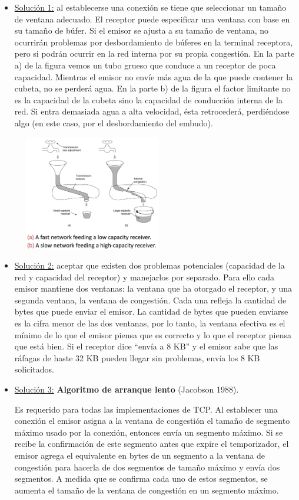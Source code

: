 \documentclass[10pt,a4paper]{report}
\begin{document}
	\begin{itemize}
		\item  \underline{Solución 1:} al establecerse una conexión se tiene que seleccionar un tamaño de ventana adecuado. El receptor puede especificar una ventana con base en su tamaño de búfer. Si el emisor se ajusta a su tamaño de ventana, no ocurrirán problemas por desbordamiento de búferes en la terminal receptora, pero si podrán ocurrir en la red interna por su propia congestión. En la parte a) de la figura vemos un tubo grueso que conduce a un receptor de poca capacidad. Mientras el emisor no envíe más agua de la que puede contener la cubeta, no se perderá agua. En la parte b) de la figura el factor limitante no es la capacidad de la cubeta sino la capacidad de conducción interna de la red. Si entra demasiada agua a alta velocidad, ésta retrocederá, perdiéndose algo (en este caso, por el desbordamiento del embudo).

	\begin{center}
		\includegraphics[width=7cm, height=5cm]{./imagenes/sol1.png} 
	\end{center}

	\item \underline{Solución 2:} aceptar que existen dos problemas potenciales (capacidad de la red y capacidad del receptor) y manejarlos por separado. Para ello cada emisor mantiene dos ventanas:  la ventana que ha otorgado el receptor, y una segunda ventana, la ventana de congestión. Cada una refleja la cantidad de bytes que puede enviar el emisor. La cantidad de bytes que pueden enviarse es la cifra menor de las dos ventanas, por lo tanto, la ventana efectiva es el mínimo de lo que el emisor piensa que es correcto y lo que el receptor piensa que está bien. Si el receptor dice “envía a 8 KB” y el emisor sabe que las ráfagas de haste 32 KB pueden llegar sin problemas, envía los 8 KB solicitados.

	\item \underline{Solución 3:} \textbf{Algoritmo de arranque lento} (Jacobson 1988). 	
		\par Es requerido para todas las implementaciones de TCP. Al establecer una conexión el emisor asigna a la ventana de congestión el tamaño de segmento máximo usado por la conexión, entonces envía un segmento máximo. Si se recibe la confirmación de este segmento antes que expire el temporizador, el emisor agrega el equivalente en bytes de un segmento a la ventana de congestión para hacerla de dos segmentos de tamaño máximo y envía dos segmentos. A medida que se confirma cada uno de estos segmentos, se aumenta el tamaño de la ventana de congestión en un segmento máximo.
	

\end{itemize}
\end{document}
